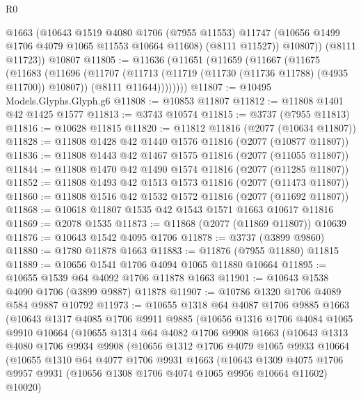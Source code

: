\begin{lexlean}{R0}
\begin{coremodule}
          @1663
          (@10643
            @1519
            @4080
            @1706
            (@7955 @11553)
            @11747
            (@10656 @1499 @1706 @4079 @1065 @11553 @10664 @11608)
            (@8111 @11527))
          @10807))
      (@8111 @11723))
    @10807
@11805 := @11636
    (@11651
      (@11659
        (@11667
          (@11675
            (@11683
              (@11696
                (@11707
                  (@11713 (@11719 (@11730 (@11736 @11788) (@4935 @11700)) @10807))
                  (@8111 @11644))))))))
@11807 := @10495 Models.Glyphs.Glyph.g6
@11808 := @10853 @11807
@11812 := @11808 @1401 @42 @1425 @1577
@11813 := @3743 @10574
@11815 := @3737 (@7955 @11813)
@11816 := @10628 @11815
@11820 := @11812 @11816 (@2077 (@10634 @11807))
@11828 := @11808 @1428 @42 @1440 @1576 @11816 (@2077 (@10877 @11807))
@11836 := @11808 @1443 @42 @1467 @1575 @11816 (@2077 (@11055 @11807))
@11844 := @11808 @1470 @42 @1490 @1574 @11816 (@2077 (@11285 @11807))
@11852 := @11808 @1493 @42 @1513 @1573 @11816 (@2077 (@11473 @11807))
@11860 := @11808 @1516 @42 @1532 @1572 @11816 (@2077 (@11692 @11807))
@11868 := @10618 @11807 @1535 @42 @1543 @1571 @1663 @10617 @11816
@11869 := @2078 @1535
@11873 := @11868 (@2077 (@11869 @11807)) @10639
@11876 := @10643 @1542 @4095 @1706
@11878 := @3737 (@3899 @9860)
@11880 := @1780 @11878 @1663
@11883 := @11876 (@7955 @11880) @11815
@11889 := @10656 @1541 @1706 @4094 @1065 @11880 @10664
@11895 := @10655 @1539 @64 @4092 @1706 @11878 @1663
@11901 := @10643 @1538 @4090 @1706 (@3899 @9887) @11878
@11907 := @10786 @1320 @1706 @4089 @584 @9887 @10792
@11973 := @10655
    @1318
    @64
    @4087
    @1706
    @9885
    @1663
    (@10643
      @1317
      @4085
      @1706
      @9911
      @9885
      (@10656
        @1316
        @1706
        @4084
        @1065
        @9910
        @10664
        (@10655
          @1314
          @64
          @4082
          @1706
          @9908
          @1663
          (@10643
            @1313
            @4080
            @1706
            @9934
            @9908
            (@10656
              @1312
              @1706
              @4079
              @1065
              @9933
              @10664
              (@10655
                @1310
                @64
                @4077
                @1706
                @9931
                @1663
                (@10643
                  @1309
                  @4075
                  @1706
                  @9957
                  @9931
                  (@10656 @1308 @1706 @4074 @1065 @9956 @10664 @11602)
                  @10020)

\end{coremodule}
\end{lexlean}
